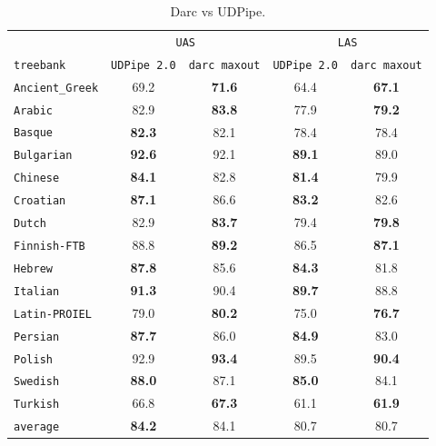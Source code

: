 \documentclass[11pt]{article}
\begin{document}
\begin{table}
  \centering
  {\small
    \begin{tabular}{lcccc}
      \toprule
      &\multicolumn{2}{c}{\texttt{UAS}} &\multicolumn{2}{c}{\texttt{LAS}}\\
      \texttt{treebank} &\texttt{UDPipe 2.0} &\texttt{darc maxout} &\texttt{UDPipe 2.0} &\texttt{darc maxout}\\
      \midrule
      \texttt{Ancient\_Greek} &69.2 &\textbf{71.6} &64.4 &\textbf{67.1}\\
      \texttt{Arabic        } &82.9 &\textbf{83.8} &77.9 &\textbf{79.2}\\
      \texttt{Basque        } &\textbf{82.3} &82.1 &78.4 &78.4\\
      \texttt{Bulgarian     } &\textbf{92.6} &92.1 &\textbf{89.1} &89.0\\
      \texttt{Chinese       } &\textbf{84.1} &82.8 &\textbf{81.4} &79.9\\
      \texttt{Croatian      } &\textbf{87.1} &86.6 &\textbf{83.2} &82.6\\
      \texttt{Dutch         } &82.9 &\textbf{83.7} &79.4 &\textbf{79.8}\\
      \texttt{Finnish-FTB   } &88.8 &\textbf{89.2} &86.5 &\textbf{87.1}\\
      \texttt{Hebrew        } &\textbf{87.8} &85.6 &\textbf{84.3} &81.8\\
      \texttt{Italian       } &\textbf{91.3} &90.4 &\textbf{89.7} &88.8\\
      \texttt{Latin-PROIEL  } &79.0 &\textbf{80.2} &75.0 &\textbf{76.7}\\
      \texttt{Persian       } &\textbf{87.7} &86.0 &\textbf{84.9} &83.0\\
      \texttt{Polish        } &92.9 &\textbf{93.4} &89.5 &\textbf{90.4}\\
      \texttt{Swedish       } &\textbf{88.0} &87.1 &\textbf{85.0} &84.1\\
      \texttt{Turkish       } &66.8 &\textbf{67.3} &61.1 &\textbf{61.9}\\
      \midrule
      \texttt{average       } &\textbf{84.2} &84.1 &80.7 &80.7\\
      \bottomrule
    \end{tabular}}
  \caption[]{\label{tab:udpipe}Darc vs UDPipe.}
\end{table}
\end{document}
